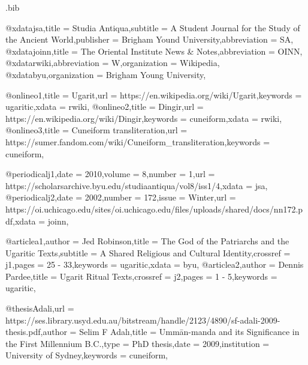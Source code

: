 \begin{filecontents*}[overwrite]{\jobname.bib}

@xdata{jsa,title = {Studia Antiqua},subtitle = {A Student Journal for the Study of the Ancient World},publisher = {Brigham Yound University},abbreviation = {SA},}
@xdata{joinn,title = {The Oriental Institute News \& Notes},abbreviation = {OINN},}
@xdata{rwiki,abbreviation = {W},organization = {Wikipedia},}
@xdata{byu,organization = {Brigham Young University},}


@online{o1,title = {Ugarit},url = {https://en.wikipedia.org/wiki/Ugarit},keywords = {ugaritic},xdata = {rwiki},}
@online{o2,title = {Dingir},url = {https://en.wikipedia.org/wiki/Dingir},keywords = {cuneiform},xdata = {rwiki},}
@online{o3,title = {Cuneiform transliteration},url = {https://sumer.fandom.com/wiki/Cuneiform_transliteration},keywords = {cuneiform},}


@periodical{j1,date = {2010},volume = {8},number = {1},url = {https://scholarsarchive.byu.edu/studiaantiqua/vol8/iss1/4},xdata = {jsa},}
@periodical{j2,date = {2002},number = {172},issue = {Winter},url = {https://oi.uchicago.edu/sites/oi.uchicago.edu/files/uploads/shared/docs/nn172.pdf},xdata = {joinn},}

@article{a1,author = {Jed Robinson},title = {The God of the Patriarchs and the Ugaritic Texts},subtitle = {A Shared Religious and Cultural Identity},crossref = {j1},pages = {25 - 33},keywords = {ugaritic},xdata = {byu},}
@article{a2,author = {Dennis Pardee},title = {Ugarit Ritual Texts},crossref = {j2},pages = {1 - 5},keywords = {ugaritic},}
	
@thesis{Adali,url = {https://ses.library.usyd.edu.au/bitstream/handle/2123/4890/sf-adali-2009-thesis.pdf},author = {Selim F Adalı},title = {Ummān-manda and its Significance in the First Millennium B.C.},type = {PhD thesis},date = {2009},institution = {University of Sydney},keywords = {cuneiform},}

\end{filecontents*}




\documentclass{article}

\usepackage[table]{xcolor}
\pagecolor{green!3}
\newcommand\theadercolour{red!20!yellow}
\usepackage{fontspec}
\usepackage[listings]{tcolorbox}
\usepackage{longtable}
\usepackage[nil,english]{babel}
\usepackage[english=british]{csquotes}
\usepackage{multicol}
\setlength{\columnsep}{0.3cm} \setlength{\columnseprule}{1pt}


